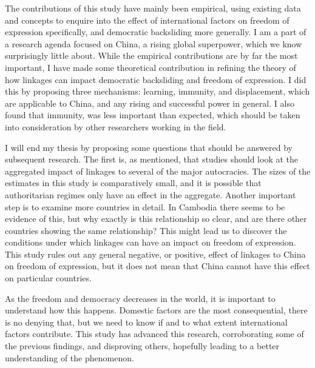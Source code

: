 The contributions of this study have mainly been empirical, using existing data and concepts to enquire into the effect of international factors on freedom of expression specifically, and democratic backsliding more generally. I am a part of a research agenda focused on China, a rising global superpower, which we know surprisingly little about. While the empirical contributions are by far the most important, I have made some theoretical contribution in refining the theory of how linkages can impact democratic backsliding and freedom of expression. I did this by proposing three mechanisms: learning, immunity, and displacement, which are applicable to China, and any rising and successful power in general. I also found that immunity, was less important than expected, which should be taken into consideration by other researchers working in the field. 

I will end my thesis by proposing some questions that should be answered by subsequent research. The first is, as mentioned, that studies should look at the aggregated impact of linkages to several of the major autocracies. The sizes of the estimates in this study is comparatively small, and it is possible that authoritarian regimes only have an effect in the aggregate. Another important step is to examine more countries in detail. In Cambodia there seems to be evidence of this, but why exactly is this relationship so clear, and are there other countries showing the same relationship? This might lead us to discover the conditions under which linkages can have an impact on freedom of expression. This study rules out any general negative, or positive, effect of linkages to China on freedom of expression, but it does not mean that China cannot have this effect on particular countries.

As the freedom and democracy decreases in the world, it is important to understand how this happens. Domestic factors are the most consequential, there is no denying that, but we need to know if and to what extent international factors contribute. This study has advanced this research, corroborating some of the previous findings, and disproving others, hopefully leading to a better understanding of the phenomenon.